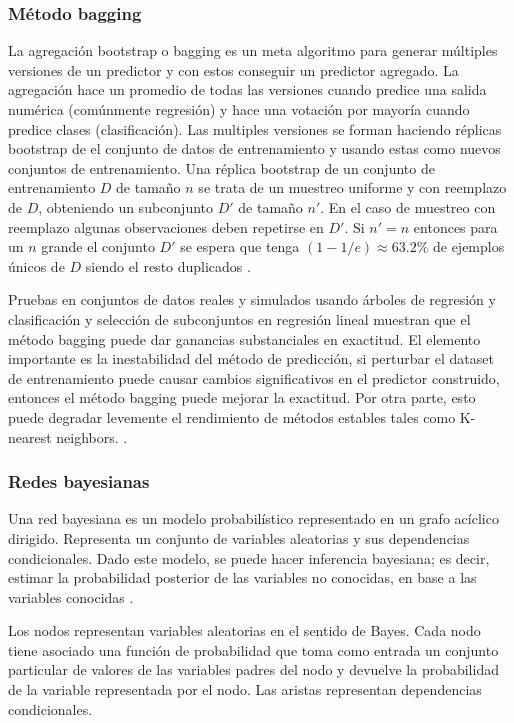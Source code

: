 \subsubsection{Método bagging}
La agregación bootstrap o bagging es un meta algoritmo para generar múltiples versiones de un predictor y con estos conseguir un predictor agregado. La agregación hace un promedio de todas las versiones cuando predice una salida numérica (comúnmente regresión) y hace una votación por mayoría cuando predice clases (clasificación).
Las multiples versiones se forman haciendo réplicas bootstrap de el conjunto de datos de entrenamiento y usando estas como nuevos conjuntos de entrenamiento.
Una réplica bootstrap de un conjunto de entrenamiento $D$ de tamaño $n$ se trata de un muestreo uniforme y con reemplazo de $D$, obteniendo un subconjunto $D'$ de tamaño $n'$. En el caso de muestreo con reemplazo algunas observaciones deben repetirse en $D'$. Si $n'=n$ entonces para un $n$ grande el conjunto $D'$ se espera que tenga $(1-1/e) \approx 63.2\%$ de ejemplos únicos de $D$ siendo el resto duplicados \cite{EstimatingtheSizeandConfidenceofaStatisticalAudit}.

Pruebas en conjuntos de datos reales y simulados usando árboles de regresión y clasificación y selección de subconjuntos en regresión lineal muestran que el método bagging puede dar ganancias substanciales en exactitud.
El elemento importante es la inestabilidad del método de predicción, si perturbar el dataset de entrenamiento puede causar cambios significativos en el predictor construido, entonces el método bagging puede mejorar la exactitud. Por otra parte, esto puede degradar levemente el rendimiento de métodos estables tales como K-nearest neighbors.
\cite{BreimanLMachineLearning1996}.

\subsubsection{Redes bayesianas}
Una red bayesiana es un modelo probabilístico representado en un grafo acíclico dirigido. Representa un conjunto de variables aleatorias y sus dependencias condicionales. Dado este modelo, se puede hacer inferencia bayesiana; es decir, estimar la probabilidad posterior de las variables no conocidas, en base a las variables conocidas \cite{LESucarChapter1RedesBayesianas}. 

Los nodos representan variables aleatorias en el sentido de Bayes. Cada nodo tiene asociado una función de probabilidad que toma como entrada un conjunto particular de valores de las variables padres del nodo y devuelve la probabilidad de la variable representada por el nodo. Las aristas representan dependencias condicionales.


